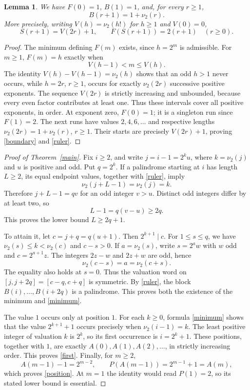 \documentclass[11pt]{article}
\newtheorem{lemma}[theorem]{Lemma}
\newcommand{\vv}{\nu_2}
\begin{document}
\begin{lemma}\label{plateaus}
We have $F(0)=1$, $B(1)=1$, and, for every $r\ge1$,
\begin{equation}\label{ruler}
 B(r+1)=1+\vv(r).
\end{equation}
More precisely, writing $V(h)=\vv(h!)$ for $h\ge1$ and $V(0)=0$,
\begin{equation}\label{boundary}
 S(r+1)=V(2r)+1,\qquad F(S(r+1))=2(r+1)\quad(r\ge0).
\end{equation}
\end{lemma}
\begin{proof}
The minimum defining $F(m)$ exists, since $h=2^m$ is admissible.
For $m\ge1$, $F(m)=h$ exactly when
\[
 V(h-1)<m\le V(h).
\]
The identity $V(h)-V(h-1)=\vv(h)$ shows that an odd $h>1$ never
occurs, while $h=2r$, $r\ge1$, occurs for exactly $\vv(2r)$
successive positive exponents. The sequence $V(2r)$ is strictly
increasing and unbounded, because every even factor contributes at
least one. Thus these intervals cover all positive exponents, in order.
At exponent zero, $F(0)=1$; it is a singleton run since $F(1)=2$.
The next runs have values $2,4,6,\ldots$ and respective lengths
$\vv(2r)=1+\vv(r)$, $r\ge1$. Their starts are precisely
$V(2r)+1$, proving \eqref{boundary} and \eqref{ruler}.
\end{proof}

\begin{proof}[Proof of Theorem~\ref{main}]
Fix $i\ge2$, and write $j=i-1=2^k u$, where $k=\vv(j)$ and $u$ is
positive and odd. Put $q=2^k$.
If a palindrome starting at $i$ has length $L\ge2$, its equal endpoint
values, together with \eqref{ruler}, imply
\[
 \vv(j+L-1)=\vv(j)=k.
\]
Therefore $j+L-1=qv$ for an odd integer $v>u$. Distinct odd integers
differ by at least two, so
\[
 L-1=q(v-u)\ge2q.
\]
This proves the lower bound $L\ge2q+1$.

To attain it, let $c=j+q=q(u+1)$. Then $2^{k+1}\mid c$.
For $1\le s\le q$, we have $\vv(s)\le k<\vv(c)$ and $c-s>0$.
If $a=\vv(s)$, write $s=2^a w$ with $w$ odd and $c=2^{a+1}z$.
The integers $2z-w$ and $2z+w$ are odd, hence
\[
 \vv(c-s)=a=\vv(c+s).
\]
The equality also holds at $s=0$. Thus the valuation word on
$[j,j+2q]=[c-q,c+q]$ is symmetric. By \eqref{ruler}, the block
$B(i),\ldots,B(i+2q)$ is a palindrome. This proves both the existence
of the minimum and \eqref{minimum}.

The value $1$ occurs only at position $1$. For each $k\ge0$, formula
\eqref{minimum} shows that the value $2^{k+1}+1$ occurs precisely when
$\vv(i-1)=k$. The least positive integer of valuation $k$ is $2^k$,
so its first occurrence is $i=2^k+1$. These positions, together with
$1$, are exactly $A(0),A(1),A(2),\ldots$, in strictly increasing order.
This proves \eqref{first}. Finally, for $m\ge2$,
\[
 A(m-1)-1=2^{m-2},\qquad
 P(A(m-1))=2^{m-1}+1=A(m),
\]
which proves \eqref{position}. At $m=1$ the identity would read
$P(1)=2$, so its stated lower bound is essential.
\end{proof}
\end{document}
